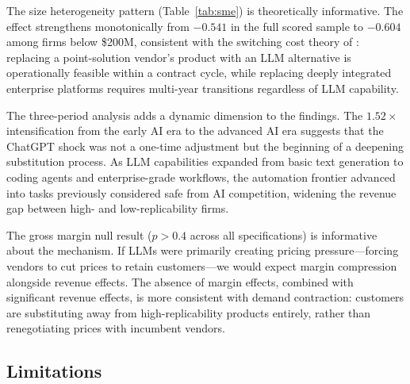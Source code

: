 \documentclass[12pt,a4paper]{article}
\begin{document}
The size heterogeneity pattern (Table~\ref{tab:sme}) is theoretically informative. The effect strengthens monotonically from $-0.541$ in the full scored sample to $-0.604$ among firms below \$200M, consistent with the switching cost theory of \citet{farrell2007}: replacing a point-solution vendor's product with an LLM alternative is operationally feasible within a contract cycle, while replacing deeply integrated enterprise platforms requires multi-year transitions regardless of LLM capability.

The three-period analysis adds a dynamic dimension to the findings. The $1.52\times$ intensification from the early AI era to the advanced AI era suggests that the ChatGPT shock was not a one-time adjustment but the beginning of a deepening substitution process. As LLM capabilities expanded from basic text generation to coding agents and enterprise-grade workflows, the automation frontier advanced into tasks previously considered safe from AI competition, widening the revenue gap between high- and low-replicability firms.

The gross margin null result ($p > 0.4$ across all specifications) is informative about the mechanism. If LLMs were primarily creating pricing pressure---forcing vendors to cut prices to retain customers---we would expect margin compression alongside revenue effects. The absence of margin effects, combined with significant revenue effects, is more consistent with demand contraction: customers are substituting away from high-replicability products entirely, rather than renegotiating prices with incumbent vendors.

\subsection{Limitations}
\end{document}
